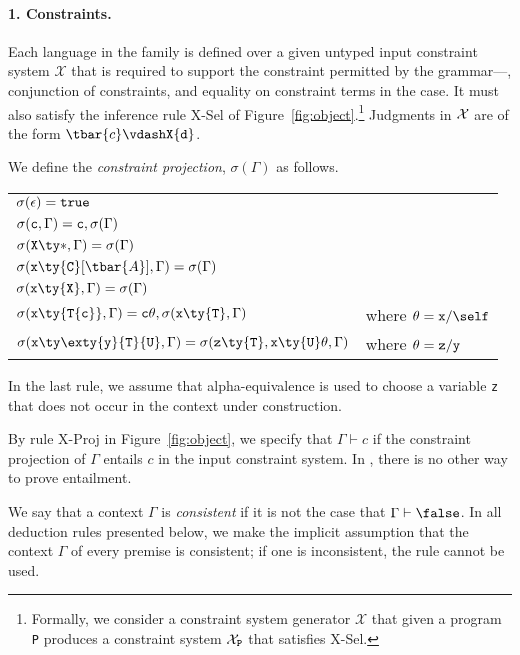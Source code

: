 \paragraph{1. Constraints.}
Each language in the  family is defined over a given untyped input constraint system $\mathcal{X}$ that is required to support the constraint permitted by the  grammar---\true{}, conjunction of constraints, and equality on constraint terms in the \FXGL{\cdot} case. It must also satisfy the inference rule {\sc X-Sel} of Figure~\ref{fig:object}.\footnote{Formally, we consider a constraint system generator $\mathcal{X}$ that given a program {\tt P} produces a constraint system $\mathcal{X}_{\tt P}$ that satisfies {\sc X-Sel}.} Judgments in $\cal X$ are of the form $\tbar{c} \vdashX {\tt d}$.

We define the {\em constraint projection}, $\sigma(\Gamma)$ as follows.
%
\begin{center}
\begin{tabular}{ll}
$\sigma(\epsilon)={\tt true}$\\
$\sigma({\tt c},\Gamma) = {\tt c}, \sigma(\Gamma)$\\
$\sigma({\tt X}\ty*, \Gamma)=\sigma(\Gamma)$\\
$\sigma({\tt x}\ty{\tt C}[\tbar{A}], \Gamma)=\sigma(\Gamma)$\\
$\sigma({\tt x}\ty{\tt X}, \Gamma)=\sigma(\Gamma)$\\
$\sigma({\tt x}\ty{\tt T\{c\}}, \Gamma)={\tt c}\theta,\sigma({\tt x}\ty{\tt T},\Gamma)$ & where $\theta={\tt x}/\self$\\
$\sigma({\tt x}\ty\exty{{\tt y}}{{\tt T}}{{\tt U}}, \Gamma)=\sigma({\tt z}\ty{\tt T}, {\tt x}\ty{\tt U}\theta,\Gamma)$ & where $\theta={\tt z}/{\tt y}$\\
\end{tabular}
\end{center}
%
In the last rule, we assume that alpha-equivalence is used to choose a variable {\tt z} that does not occur in the context under construction.

By rule {\sc X-Proj} in Figure~\ref{fig:object}, we specify that $\Gamma\vdash c$ if the constraint projection of $\Gamma$ entails $c$ in the input constraint system. In \FXGL{\cdot}, there is no other way to prove entailment.

We say that a context $\Gamma$ is {\em consistent} if it is not the case that $\Gamma\vdash\false$.
In all deduction rules presented below, we make the implicit assumption that the context $\Gamma$ of every premise is consistent; if one is inconsistent, the rule cannot be used.

